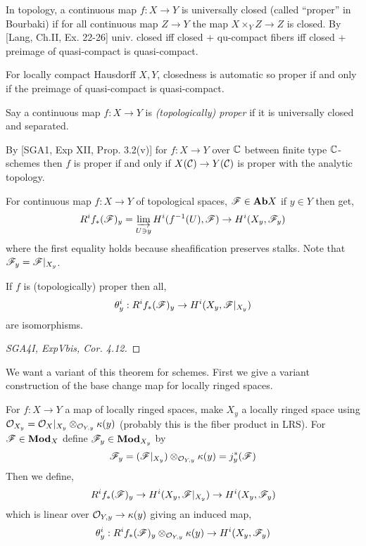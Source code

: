 \documentclass[12pt]{article}
\begin{document}
\begin{rmk}
In topology, a continuous map $f : X \to Y$ is universally closed (called ``proper'' in Bourbaki) if for all continuous map $Z \to Y$ the map $X \times_Y Z \to Z$ is closed. By [Lang, Ch.II, Ex. 22-26] univ. closed iff closed + qu-compact fibers iff closed + preimage of quasi-compact is quasi-compact.
\end{rmk}

\begin{rmk}
For locally compact Hausdorff $X,Y$, closedness is automatic so proper if and only if the preimage of quasi-compact is quasi-compact.
\end{rmk}

\begin{defn}
Say a continuous map $f : X \to Y$ is \textit{(topologically) proper} if it is universally closed and separated. 
\end{defn}

\begin{rmk}
By [SGA1, Exp XII, Prop. 3.2(v)] for $f : X \to Y$ over $\mathbb{C}$ between finite type $\mathbb{C}$-schemes  then $f$ is proper if and only if $X(\mathcal{C}) \to Y(\mathcal{C})$ is proper with the analytic topology. 
\end{rmk}

\begin{rmk}
For continuous map $f : X \to Y$ of topological spaces, $\mathscr{F} \in \mathbf{Ab}{X}$ if $y \in Y$ then get,
\[ R^i f_* (\mathscr{F})_y = \varinjlim_{U \ni y} H^i(f^{-1}(U), \mathscr{F}) \to H^i(X_y, \mathscr{F}_y) \]
where the first equality holds because sheafification preserves stalks. Note that $\mathscr{F}_y = \mathscr{F}|_{X_y}$. 
\end{rmk}

\begin{thm}
If $f$ is (topologically) proper then all,
\[ \theta^i_y : R^i f_* (\mathscr{F})_y \to H^i(X_y, \mathscr{F}|_{X_y}) \]
are isomorphisms.
\end{thm}

\begin{proof}
[SGA4I, ExpVbis, Cor. 4.12]
\end{proof}

\begin{rmk}
We want a variant of this theorem for schemes. First we give a variant construction of the base change map for locally ringed spaces.
\end{rmk}

\begin{defn}
For $f : X \to Y$ a map of locally ringed spaces, make $X_y$ a locally ringed space using $\mathcal{O}_{X_y} = \mathcal{O}_{X}|_{X_y} \otimes_{\mathcal{O}_{Y, y}} \kappa(y)$ (probably this is the fiber product in LRS). For $\mathscr{F} \in \mathbf{Mod}_{X}$ define $\mathscr{F}_y \in \mathbf{Mod}_{X_y}$ by 
\[ \mathscr{F}_y = (\mathscr{F}|_{X_y}) \otimes_{\mathcal{O}_{Y, y}} \kappa(y) = j_y^*(\mathscr{F}) \]
Then we define,
\[  R^i f_* (\mathscr{F})_y \to H^i(X_y, \mathscr{F}|_{X_y}) \to H^i(X_y, \mathscr{F}_y) \]
which is linear over $\mathcal{O}_{Y, y} \to \kappa(y)$ giving an induced map,
\[ \theta^i_y : R^i f_* (\mathscr{F})_y \otimes_{\mathcal{O}_{Y, y}} \kappa(y) \to H^i(X_y, \mathscr{F}_y) \]
\end{defn}
\end{document}
